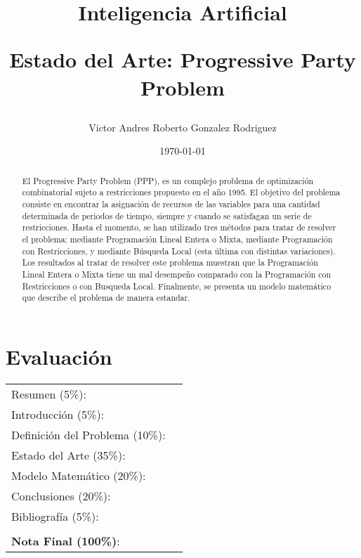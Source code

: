 \documentclass[letter, 10pt]{article}
\begin{document}
\title{Inteligencia Artificial \\ \begin{Large}Estado del Arte: Progressive Party Problem\end{Large}}
\author{Victor Andres Roberto Gonzalez Rodriguez}
\date{\today}
\maketitle


\section*{Evaluación}

\begin{tabular}{ll}
Resumen (5\%): & \underline{\hspace{2cm}} \\
Introducción (5\%):  & \underline{\hspace{2cm}} \\
Definición del Problema (10\%):  & \underline{\hspace{2cm}} \\
Estado del Arte (35\%):  & \underline{\hspace{2cm}} \\
Modelo Matemático (20\%): &  \underline{\hspace{2cm}}\\
Conclusiones (20\%): &  \underline{\hspace{2cm}}\\
Bibliografía (5\%): & \underline{\hspace{2cm}}\\
 &  \\
\textbf{Nota Final (100\%)}:   & \underline{\hspace{2cm}}
\end{tabular}
\vspace{2cm}


\begin{abstract}
El Progressive Party Problem (PPP), es un complejo problema de optimización combinatorial sujeto a restricciones propuesto en el año 1995. El objetivo del problema consiste en encontrar la asignación de recursos de las variables para una cantidad determinada de periodos de tiempo, siempre y cuando se satisfagan un serie de restricciones. Hasta el momento, se han utilizado tres métodos para tratar de resolver el problema: mediante Programación Lineal Entera o Mixta, mediante Programación con Restricciones, y mediante Búsqueda Local (esta última con distintas variaciones). Los resultados al tratar de resolver este problema muestran que la Programación Lineal Entera o Mixta tiene un mal desempeño comparado con la Programación con Restricciones o con Busqueda Local. Finalmente, se presenta un modelo matemático que describe el problema de manera estandar.
\end{abstract}
\end{document}
